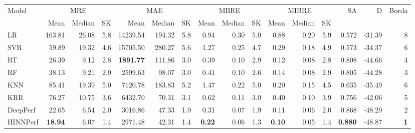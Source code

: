 \begin{tabular}{lrrrrrrrrrrrrrrr}
\toprule
Model & \multicolumn{3}{c}{MRE} & \multicolumn{3}{c}{MAE} & \multicolumn{3}{c}{MBRE} & \multicolumn{3}{c}{MIBRE} & SA & D & Borda \\
 & Mean & Median & SK & Mean & Median & SK & Mean & Median & SK & Mean & Median & SK &  &  &  \\
\midrule
LR & 163.81 & 26.08 & 5.8 & 14239.54 & 194.32 & 5.8 & 0.94 & 0.30 & 5.0 & 0.88 & 0.20 & 5.9 & 0.572 & -31.39 & 8 \\
SVR & 59.89 & 19.32 & 4.6 & 15705.50 & 280.27 & 5.6 & 1.27 & 0.25 & 4.7 & 0.29 & 0.18 & 4.9 & 0.573 & -34.37 & 6 \\
RT & 26.39 & 9.12 & 2.8 & \textbf{1891.77} & 111.86 & 3.0 & 0.39 & 0.10 & 2.9 & 0.12 & 0.08 & 2.8 & 0.808 & -44.66 & 4 \\
RF & 38.13 & 9.21 & 2.9 & 2599.63 & 98.07 & 3.0 & 0.41 & 0.10 & 2.6 & 0.14 & 0.08 & 2.9 & 0.805 & -44.28 & 3 \\
KNN & 85.41 & 19.39 & 5.0 & 7120.78 & 183.83 & 5.2 & 1.47 & 0.22 & 5.0 & 0.20 & 0.15 & 4.5 & 0.635 & -35.49 & 6 \\
KRR & 76.27 & 10.75 & 3.6 & 6432.70 & 70.31 & 3.1 & 0.62 & 0.11 & 3.0 & 0.40 & 0.10 & 3.9 & 0.756 & -42.06 & 5 \\
DeepPerf & 22.65 & 6.54 & 2.0 & 3016.86 & 47.33 & 1.9 & 0.31 & 0.07 & 1.9 & 0.11 & 0.06 & 2.0 & 0.868 & -48.29 & 2 \\
HINNPerf & \textbf{18.94} & 6.07 & 1.4 & 2971.48 & 42.31 & 1.4 & \textbf{0.22} & 0.06 & 1.3 & \textbf{0.10} & 0.05 & 1.4 & \textbf{0.880} & -48.87 & \textbf{1} \\
\bottomrule
\end{tabular}
